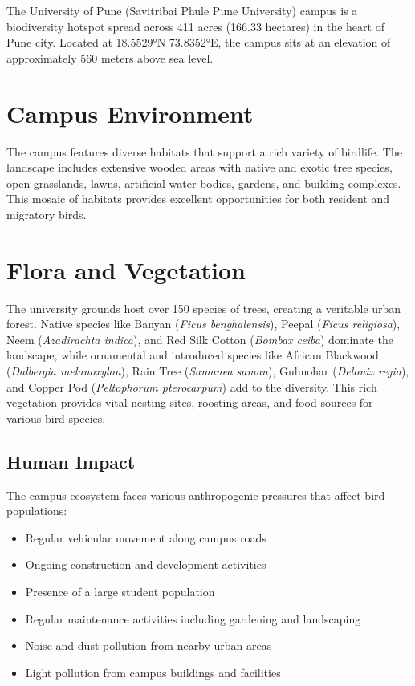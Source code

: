 \documentclass[a4paper,12pt,landscape]{memoir}
\newcommand{\introsection}[2]{%
  \begin{minipage}[t]{0.48\textwidth}
    \begin{mdframed}[
      linecolor=headingcolor,
      linewidth=1pt,
      roundcorner=5pt,
      leftmargin=0pt,
      rightmargin=0pt,
      backgroundcolor=headingcolor!5
    ]
      #1
    \end{mdframed}
  \end{minipage}\hfill
  \begin{minipage}[t]{0.48\textwidth}
    \begin{mdframed}[
      linecolor=headingcolor,
      linewidth=1pt,
      roundcorner=5pt,
      leftmargin=0pt,
      rightmargin=0pt,
      backgroundcolor=headingcolor!5
    ]
      #2
    \end{mdframed}
  \end{minipage}
  \newpage
}
\begin{document}
\introsection{%
  The University of Pune (Savitribai Phule Pune University) campus is a biodiversity hotspot spread across 411 acres (166.33 hectares) in the heart of Pune city. Located at 18.5529°N 73.8352°E, the campus sits at an elevation of approximately 560 meters above sea level.

  \section*{Campus Environment}
  The campus features diverse habitats that support a rich variety of birdlife. The landscape includes extensive wooded areas with native and exotic tree species, open grasslands, lawns, artificial water bodies, gardens, and building complexes. This mosaic of habitats provides excellent opportunities for both resident and migratory birds.

  \section*{Flora and Vegetation}
  The university grounds host over 150 species of trees, creating a veritable urban forest. Native species like Banyan (\textit{Ficus benghalensis}), Peepal (\textit{Ficus religiosa}), Neem (\textit{Azadirachta indica}), and Red Silk Cotton (\textit{Bombax ceiba}) dominate the landscape, while ornamental and introduced species like African Blackwood (\textit{Dalbergia melanoxylon}), Rain Tree (\textit{Samanea saman}), Gulmohar (\textit{Delonix regia}), and Copper Pod (\textit{Peltophorum pterocarpum}) add to the diversity. This rich vegetation provides vital nesting sites, roosting areas, and food sources for various bird species.
}{%
   
  \section*{Human Impact}
  The campus ecosystem faces various anthropogenic pressures that affect bird populations:
  \begin{itemize}
  \item Regular vehicular movement along campus roads
  \item Ongoing construction and development activities
  \item Presence of a large student population
  \item Regular maintenance activities including gardening and landscaping
  \item Noise and dust pollution from nearby urban areas
  \item Light pollution from campus buildings and facilities
  \end{itemize}
}
\end{document}
